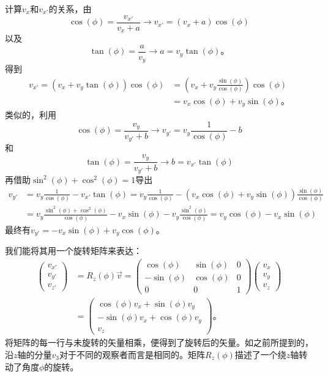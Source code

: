 计算$v_x$和$v_{x'}$的关系，由
\[
\cos(\phi)=\frac{v_{x'}}{v_x+a} \rightarrow v_{x'}=(v_x+a)\cos(\phi)
\]
以及
\[
\tan(\phi)=\frac{a}{v_y}\rightarrow a=v_y\tan(\phi)\text{。}
\]
得到
\[
\begin{aligned}
v_{x'}=(v_x+v_y\tan(\phi))\cos(\phi)&=\left(v_x+v_y\frac{\sin(\phi)}{\cos(\phi)}\right)\cos(\phi) \\
 & = v_x\cos(\phi)+v_y\sin(\phi)\text{。}
\end{aligned}
\]
类似的，利用
\[
\cos(\phi) = \frac{v_y}{v_{y'}+b}\rightarrow v_{y'}=v_y\frac{1}{\cos(\phi)}-b
\]
和
\[
\tan(\phi)=\frac{v_y}{v_{y'}+b}\rightarrow b=v_{x'}\tan(\phi)
\]
再借助$\sin^2(\phi)+\cos^2(\phi)=1$导出
\[
\begin{align}
v_{y'}&=v_y\frac{1}{\cos(\phi)}-v_{x'}\tan(\phi)=v_y\frac{1}{\cos(\phi)}-(v_x\cos(\phi)+v_y\sin(\phi))\frac{\sin(\phi)}{\cos(\phi)}  \\
&= v_y\frac{\sin^2(\phi)+\cos^2(\phi)}{\cos(\phi)}-v_x\sin(\phi)-v_y\frac{\sin^2(\phi)}{\cos(\phi)} = v_y\cos(\phi)-v_x\sin(\phi)
\end{align}
\]
最终有$v_{y'}=-v_x\sin(\phi)+v_y\cos(\phi)$。

我们能将其用一个旋转矩阵来表达：
\begin{equation}
\begin{aligned}
\begin{pmatrix}
v_{x'} \\ v_{y'} \\ v_{z'}
\end{pmatrix} &= R_z(\phi)\vec{v} =
\begin{pmatrix}
\cos(\phi) & \sin(\phi) & 0 \\
-\sin(\phi) & \cos(\phi) & 0 \\
0 & 0 & 1
\end{pmatrix}
\begin{pmatrix}
v_x \\ v_y \\ v_z
\end{pmatrix} \\
&= \begin{pmatrix}
\cos(\phi)v_x+\sin(\phi)v_y \\ -\sin(\phi)v_x+\cos(\phi)v_y \\ v_z
\end{pmatrix}\text{。}
\end{aligned}
\end{equation}
将矩阵的每一行与未旋转的矢量相乘，便得到了旋转后的矢量。如之前所提到的，沿$z$轴的分量$v_3$对于不同的观察者而言是相同的。矩阵$R_z(\phi)$描述了一个绕$z$轴转动了角度$\phi$的旋转。


